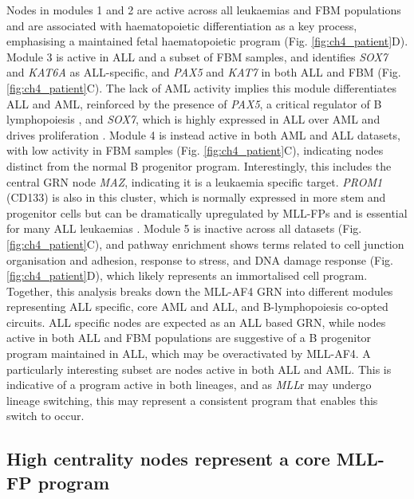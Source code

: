 Nodes in modules 1 and 2 are active across all leukaemias and FBM populations and are associated with haematopoietic differentiation as a key process, emphasising a maintained fetal haematopoietic program (Fig. \ref{fig:ch4_patient}D). Module 3 is active in ALL and a subset of FBM samples, and identifies \textit{SOX7} and \textit{KAT6A} as ALL-specific, and \textit{PAX5} and \textit{KAT7} in both ALL and FBM (Fig. \ref{fig:ch4_patient}C). The lack of AML activity implies this module differentiates ALL and AML, reinforced by the presence of \textit{PAX5}, a critical regulator of B lymphopoiesis \citep{medvedovic_pax5_2011}, and \textit{SOX7}, which is highly expressed in ALL over AML and drives proliferation \citep{cuvertino_sox7_2016}. Module 4 is instead active in both AML and ALL datasets, with low activity in FBM samples (Fig. \ref{fig:ch4_patient}C), indicating nodes distinct from the normal B progenitor program. Interestingly, this includes the central GRN node \textit{MAZ}, indicating it is a leukaemia specific target. \textit{PROM1} (CD133) is also in this cluster, which is normally expressed in more stem and progenitor cells but can be dramatically upregulated by MLL-FPs and is essential for many ALL leukaemias \citep{godfrey_h3k79me23_2021, mak_mixed_2012, obyrne_discovery_2019}. Module 5 is inactive across all datasets (Fig. \ref{fig:ch4_patient}C), and pathway enrichment shows terms related to cell junction organisation and adhesion, response to stress, and DNA damage response (Fig. \ref{fig:ch4_patient}D), which likely represents an immortalised cell program. Together, this analysis breaks down the MLL-AF4 GRN into different modules representing ALL specific, core AML and ALL, and B-lymphopoiesis co-opted circuits. ALL specific nodes are expected as an ALL based GRN, while nodes active in both ALL and FBM populations are suggestive of a B progenitor program maintained in ALL, which may be overactivated by MLL-AF4. A particularly interesting subset are nodes active in both ALL and AML. This is indicative of a program active in both lineages, and as \textit{MLL}r may undergo lineage switching, this may represent a consistent program that enables this switch to occur.

\subsection{\label{ch4:patient-core}High centrality nodes represent a core MLL-FP program}

